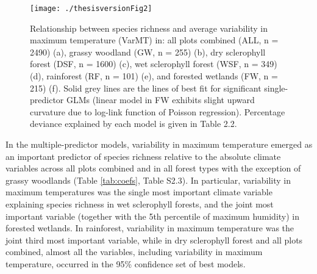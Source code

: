 \begin{figure}[H]
\centering
\texttt{[image: ./thesisversionFig2]}
\caption{Relationship between species richness and average variability in maximum temperature (VarMT) in: all plots combined (ALL, n = 2490) (a), grassy woodland (GW, n = 255) (b), dry sclerophyll forest (DSF, n = 1600) (c), wet sclerophyll forest (WSF, n = 349) (d), rainforest (RF, n = 101) (e), and forested wetlands (FW, n = 215) (f). Solid grey lines are the lines of best fit for significant single-predictor GLMs (linear model in FW exhibits slight upward curvature due to log-link function of Poisson regression). Percentage deviance explained by each model is given in Table 2.2.}
\label{fig:humpplots}
\end{figure}


In the multiple-predictor models, variability in maximum temperature emerged as an important predictor of species richness relative to the absolute climate variables across all plots combined and in all forest types with the exception of grassy woodlands (Table \ref{tab:coefs}, Table S2.3). In particular, variability in maximum temperatures was the single most important climate variable explaining species richness in wet sclerophyll forests, and the joint most important variable (together with the 5th percentile of maximum humidity) in forested wetlands. In rainforest, variability in maximum temperature was the joint third most important variable, while in dry sclerophyll forest and all plots combined, almost all the variables, including variability in maximum temperature, occurred in the 95\% confidence set of best models. 

